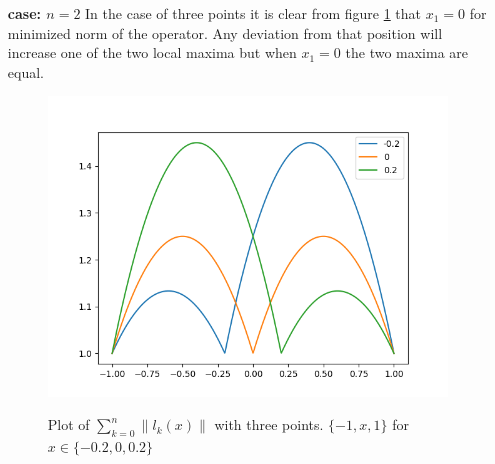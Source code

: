 \begin{solution}
\begin{enumerate}
\item[{\bf case: $n=2$}] In the case of three points it is clear from figure
  \ref{fig:4n2} that $x_1=0$ for minimized norm of the operator. Any
    deviation from that position will increase one of the two local
    maxima but when $x_1=0$ the two maxima are equal.
\begin{figure}[!ht]
  \centering \includegraphics[scale = 0.5]{code/task_4_n2.png}
  \label{fig:4n2}
  \caption{Plot of $\sum_{k=0}^n\|l_k(x)\|$ with three points. $\{-1,
      x, 1\}$ for $x \in \{-0.2, 0, 0.2\}$}
\end{figure}


\end{enumerate}
\end{solution}
